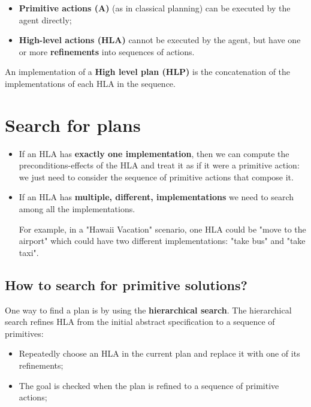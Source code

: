\documentclass{article}
\begin{document}
\begin{itemize}
    \item \textbf{Primitive actions (A)} (as in classical planning) can be executed by the agent directly;
    \item \textbf{High-level actions (HLA)} cannot be executed by the agent, but have one or more \textbf{refinements} into sequences of actions.
\end{itemize}

An implementation of a \textbf{High level plan (HLP)} is the concatenation of the implementations of each HLA in the sequence.

\section{Search for plans}

\begin{itemize}
    \item If an HLA has \textbf{exactly one implementation}, then we can compute the preconditions-effects of the HLA and treat it as if it were a primitive action: we just need to consider the sequence of primitive actions that compose it. 
    
    \item If an HLA has \textbf{multiple, different, implementations} we need to search among all the implementations.
    
    For example, in a "Hawaii Vacation" scenario, one HLA could be "move to the airport" which could have two different implementations: "take bus" and "take taxi". 

\end{itemize}

\newpage

\subsection{How to search for primitive solutions?}

One way to find a plan is by using the \textbf{hierarchical search}. The hierarchical search refines HLA from the initial abstract specification to a sequence of primitives:

\begin{itemize}
    \item Repeatedly choose an HLA in the current plan and replace it with one of its refinements;
    \item The goal is checked when the plan is refined to a sequence of primitive actions;
\end{itemize}
\end{document}
